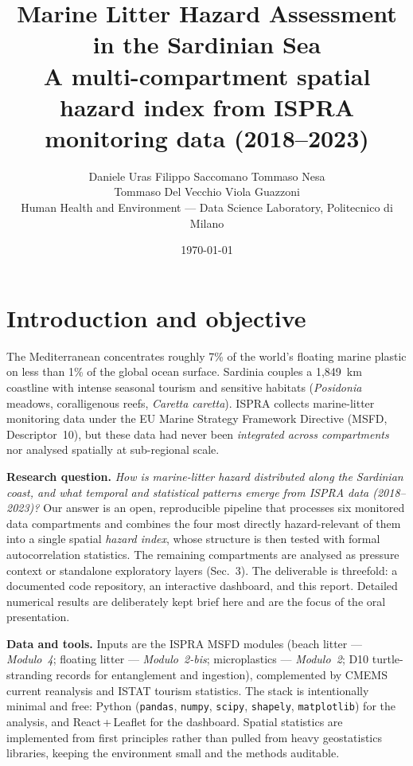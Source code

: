 \documentclass[11pt,a4paper]{article}
\title{\vspace{-1.4cm}\textbf{Marine Litter Hazard Assessment in the Sardinian Sea}\\[2pt]
\large A multi-compartment spatial hazard index from ISPRA monitoring data (2018--2023)}
\author{Daniele Uras \quad\textbar\quad Filippo Saccomano \quad\textbar\quad Tommaso Nesa\\[2pt]
Tommaso Del Vecchio \quad\textbar\quad Viola Guazzoni\\[2pt]
\normalsize Human Health and Environment --- Data Science Laboratory, Politecnico di Milano}
\date{\normalsize \today}
\begin{document}
\maketitle
\vspace{-0.7cm}

\section{Introduction and objective}
The Mediterranean concentrates roughly 7\% of the world's floating marine plastic on less than
1\% of the global ocean surface. Sardinia couples a 1{,}849~km coastline with intense seasonal
tourism and sensitive habitats (\textit{Posidonia} meadows, coralligenous reefs, \textit{Caretta
caretta}). ISPRA collects marine-litter monitoring data under the EU Marine Strategy Framework
Directive (MSFD, Descriptor~10), but these data had never been \emph{integrated across
compartments} nor analysed spatially at sub-regional scale.

\textbf{Research question.} \textit{How is marine-litter hazard distributed along the Sardinian
coast, and what temporal and statistical patterns emerge from ISPRA data (2018--2023)?} Our answer
is an open, reproducible pipeline that processes six monitored data compartments and combines the
four most directly hazard-relevant of them into a single spatial \emph{hazard index}, whose
structure is then tested with formal autocorrelation statistics. The remaining compartments are
analysed as pressure context or standalone exploratory layers (Sec.~3). The
deliverable is threefold: a documented code repository, an interactive dashboard, and this report.
Detailed numerical results are deliberately kept brief here and are the focus of the oral
presentation.

\textbf{Data and tools.} Inputs are the ISPRA MSFD modules (beach litter --- \textit{Modulo~4};
floating litter --- \textit{Modulo~2-bis}; microplastics --- \textit{Modulo~2}; D10 turtle-stranding
records for entanglement and ingestion), complemented by CMEMS current reanalysis and ISTAT
tourism statistics. The stack is intentionally minimal and free: Python (\texttt{pandas},
\texttt{numpy}, \texttt{scipy}, \texttt{shapely}, \texttt{matplotlib}) for the analysis, and
React\,+\,Leaflet for the dashboard. Spatial statistics are implemented from first principles
rather than pulled from heavy geostatistics libraries, keeping the environment small and the
methods auditable.
\end{document}
